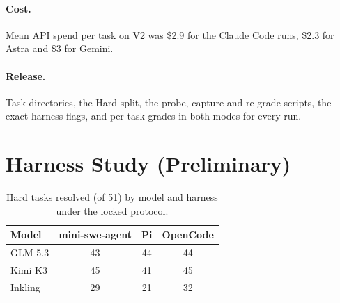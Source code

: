 \paragraph{Cost.} Mean API spend per task on V2 was \$2.9 for the Claude Code runs, \$2.3 for Astra and \$3 for Gemini.
\paragraph{Release.} Task directories, the Hard split, the probe, capture and re-grade scripts, the exact harness flags, and per-task grades in both modes for every run.

\section{Harness Study (Preliminary)}
\label{app:harness}

\begin{table}[t]
\centering\small
\begin{tabular}{lccc}
\toprule
Model & mini-swe-agent & Pi & OpenCode \\
\midrule
GLM-5.3 & 43 & 44 & 44 \\
Kimi K3 & 45 & 41 & 45 \\
Inkling & 29 & 21 & 32 \\
\bottomrule
\end{tabular}
\caption{Hard tasks resolved (of 51) by model and harness under the locked protocol. }
\label{tab:harness}
\end{table}
